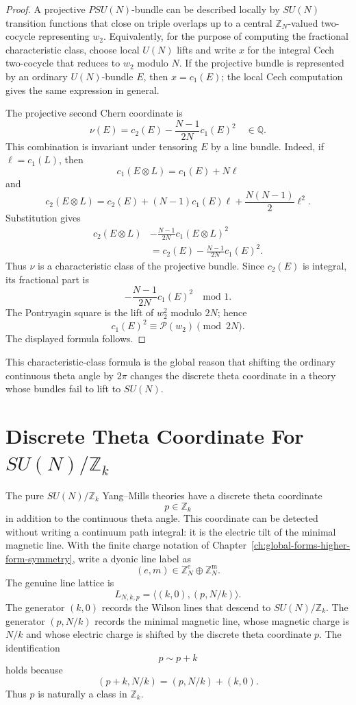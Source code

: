 \begin{proof}
A projective \(PSU(N)\)-bundle can be described locally by \(SU(N)\)
transition functions that close on triple overlaps up to a central
\(\mathbb Z_N\)-valued two-cocycle representing \(w_2\).  Equivalently, for
the purpose of computing the fractional characteristic class, choose local
\(U(N)\) lifts and write \(x\) for the integral Cech two-cocycle that reduces
to \(w_2\) modulo \(N\).  If the projective bundle is represented by an
ordinary \(U(N)\)-bundle \(E\), then \(x=c_1(E)\); the local Cech computation
gives the same expression in general.

The projective second Chern coordinate is
\[
  \nu(E)
  =
  c_2(E)-\frac{N-1}{2N}c_1(E)^2
  \quad\in\mathbb Q .
\]
This combination is invariant under tensoring \(E\) by a line bundle.  Indeed,
if \(\ell=c_1(L)\), then
\[
  c_1(E\otimes L)=c_1(E)+N\ell
\]
and
\[
  c_2(E\otimes L)
  =
  c_2(E)+(N-1)c_1(E)\ell+\frac{N(N-1)}{2}\ell^2 .
\]
Substitution gives
\[
\begin{aligned}
  c_2(E\otimes L)
  &-\frac{N-1}{2N}c_1(E\otimes L)^2\\
  &=
  c_2(E)-\frac{N-1}{2N}c_1(E)^2 .
\end{aligned}
\]
Thus \(\nu\) is a characteristic class of the projective bundle.  Since
\(c_2(E)\) is integral, its fractional part is
\[
  -\frac{N-1}{2N}c_1(E)^2
  \quad\text{mod }1 .
\]
The Pontryagin square is the lift of \(w_2^2\) modulo \(2N\); hence
\[
  c_1(E)^2\equiv \mathcal P(w_2)\pmod{2N}.
\]
The displayed formula follows.
\end{proof}

This characteristic-class formula is the global reason that shifting the
ordinary continuous theta angle by \(2\pi\) changes the discrete theta
coordinate in a theory whose bundles fail to lift to \(SU(N)\).

\section{Discrete Theta Coordinate For \texorpdfstring{\(SU(N)/\mathbb Z_k\)}{SU(N)/Zk}}

The pure \(SU(N)/\mathbb Z_k\) Yang--Mills theories have a discrete theta
coordinate
\[
  p\in\mathbb Z_k
\]
in addition to the continuous theta angle.  This coordinate can be detected
without writing a continuum path integral: it is the electric tilt of the
minimal magnetic line.  With the finite charge notation of
Chapter~\ref{ch:global-forms-higher-form-symmetry}, write a dyonic line label
as
\[
  (e,m)\in\mathbb Z_N^{\mathrm e}\oplus\mathbb Z_N^{\mathrm m}.
\]
The genuine line lattice is
\[
  L_{N,k,p}
  =
  \langle (k,0),(p,N/k)\rangle .
\]
The generator \((k,0)\) records the Wilson lines that descend to
\(SU(N)/\mathbb Z_k\).  The generator \((p,N/k)\) records the minimal magnetic
line, whose magnetic charge is \(N/k\) and whose electric charge is shifted by
the discrete theta coordinate \(p\).  The identification
\[
  p\sim p+k
\]
holds because
\[
  (p+k,N/k)=(p,N/k)+(k,0).
\]
Thus \(p\) is naturally a class in \(\mathbb Z_k\).

